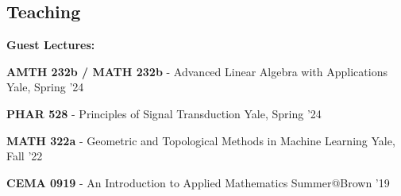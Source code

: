 \documentclass[margin,line]{res}
\newenvironment{list1}{
  \begin{list}{\ding{113}}{
      \setlength{\itemsep}{0in}
      \setlength{\parsep}{0in} \setlength{\parskip}{0in}
      \setlength{\topsep}{0in} \setlength{\partopsep}{0in}
      \setlength{\leftmargin}{0.17in}}}{\end{list}}
\begin{document}
\begin{resume}

\section{\sc Teaching}

\textbf{Guest Lectures:}
\vspace*{.2cm}

\begin{list1}
\setlength\itemsep{0.25em}
\item[] {\bf AMTH 232b / MATH 232b} - Advanced Linear Algebra with Applications \hfill Yale, Spring '24
\item[] {\bf PHAR 528} - Principles of Signal Transduction \hfill Yale, Spring '24
\item[] {\bf MATH 322a} - Geometric and Topological Methods in Machine Learning \hfill Yale, Fall '22
\item[] {\bf CEMA 0919} - An Introduction to Applied Mathematics \hfill Summer@Brown '19
\end{list1} 


\end{resume}
\end{document}
